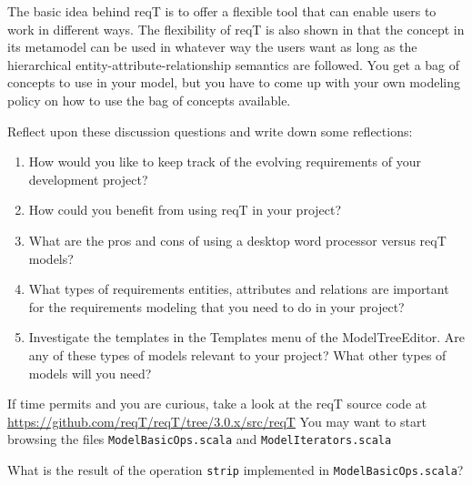\documentclass[11pt]{article}
\begin{document}
The basic idea behind reqT is to offer a flexible tool that can enable users to work in different ways. The flexibility of reqT is also shown in that the concept in its metamodel can be used in whatever way the users want as long as the hierarchical entity-attribute-relationship semantics are followed. You get a bag of concepts to use in your model, but you have to come up with your own modeling policy on how to use the bag of concepts available.

\begin{framed}
Reflect upon these discussion questions and write down some reflections:
\begin{enumerate}
\item How would you like to keep track of the evolving requirements of your development project?
\item How could you benefit from using reqT in your project?
\item What are the pros and cons of using a desktop word processor versus reqT models? 
\item What types of requirements entities, attributes and relations are important for the requirements modeling that you need to do in your project?
\item Investigate the templates in the Templates menu of the ModelTreeEditor. Are any of these types of models relevant to your project? What other types of models will you need?
\end{enumerate}
\end{framed}
{\footnotesize
\noindent If time permits and you are curious, take a look at the reqT source code at \newline\url{https://github.com/reqT/reqT/tree/3.0.x/src/reqT}
\newline\noindent You may want to start browsing the files \verb+ModelBasicOps.scala+ and  \verb+ModelIterators.scala+ 
\begin{framed}
\noindent What is the result of the operation \verb+strip+ implemented in  \verb+ModelBasicOps.scala+?
\end{framed}
}
\end{document}
